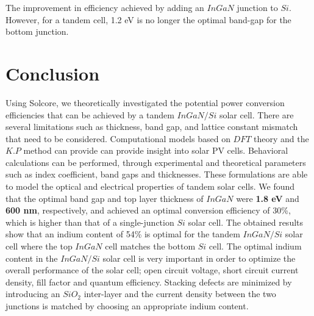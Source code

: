 \documentclass[preprint,12pt]{elsarticle}
\begin{document}
The improvement in efficiency achieved by adding an $InGaN$ junction to $Si$.  However, for a tandem cell, 1.2 eV is no longer the optimal band-gap for the bottom junction.

\section{Conclusion} \label{sec:Con}

Using Solcore, we theoretically investigated the potential power conversion efficiencies that can be achieved by a tandem $InGaN/Si$ solar cell. There are several limitations such as thickness, band gap, and lattice constant mismatch that need to be considered. Computational models based on $DFT$ theory and the $K.P$ method can provide can provide insight into solar PV cells. Behavioral calculations can be performed, through experimental and theoretical parameters such as index coefficient, band gaps and thicknesses. These formulations are able to model the optical and electrical properties of tandem solar cells. We found that the optimal band gap and top layer thickness of $InGaN$ were \textbf{1.8 eV} and \textbf{600 nm}, respectively, and achieved an optimal conversion efficiency of 30\%, which is higher than that of a single-junction $Si$ solar cell. The obtained results show that an indium content of 54\% is optimal for the tandem $InGaN/Si$ solar cell where the top $InGaN$ cell matches the bottom $Si$ cell. The optimal indium content in the $InGaN/Si$ solar cell is very important in order to optimize the overall performance of the solar cell; open circuit voltage, short circuit current density, fill factor and quantum efficiency. Stacking defects are minimized by introducing an $SiO_{2}$ inter-layer and the current density between the two junctions is matched by choosing an appropriate indium content.

 






\end{document}
